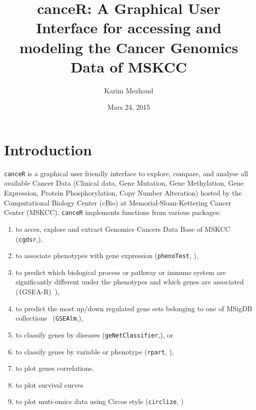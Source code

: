 \documentclass[a4paper]{article}
\begin{document}




\title{canceR: A Graphical User Interface for accessing and modeling the Cancer Genomics Data of MSKCC}
\author{Karim Mezhoud}
\date{Mars 24, 2015}
\maketitle


\tableofcontents

\newpage

\section{Introduction}
\texttt{canceR} is  a graphical user friendly interface to explore, compare, and analyse all available Cancer Data (Clinical data, Gene Mutation, Gene Methylation, Gene Expression, Protein Phosphorylation, Copy Number Alteration) hosted by the Computational Biology Center (cBio) at Memorial-Sloan-Kettering Cancer Center (MSKCC). \texttt{canceR} implements functions from various packages:
\begin{enumerate}
\item to acces, explore and extract Genomics Cancers Data Base of MSKCC (\texttt{cgdsr},\cite{Cerami2012,Gao2013}),
\item to associate phenotypes with gene expression (\texttt{phenoTest}, \cite{Planet2013}),
\item to predict which biological process or pathway or immune system are significantly different under the phenotypes and which genes are associated (\texttt(GSEA-R)~\cite{Subramanian2005,Subramanian2007}),
\item to predict the most up/down regulated gene sets belonging to one of MSigDB collections~\cite{Subramanian2005} (\texttt{GSEAlm},\cite{Oron2008}),
\item to classify genes by diseases (\texttt{geNetClassifier},\cite{Aibar2013}), or
\item to classify genes by variable or phenotype (\texttt{rpart}, \cite{Therneau2014}),
\item to plot genes correlations.
\item to plot survival curves
\item to plot muti-omics data using Circos style (\texttt{circlize}, \cite{Gu2014})

\end{enumerate}
\end{document}
